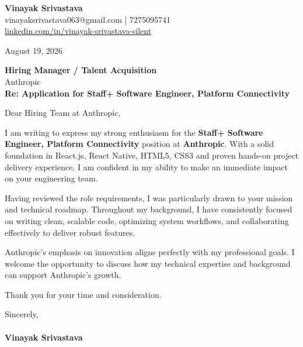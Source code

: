 \documentclass[11pt,a4paper]{article}
\begin{document}
\thispagestyle{empty}

{\Large \textbf{Vinayak Srivastava}}\\
vinayaksrivastava063@gmail.com | 7275095741 \\
\url{linkedin.com/in/vinayak-srivastava-silent}

\vspace{1em}
\hfill August 19, 2026

\textbf{Hiring Manager / Talent Acquisition}\\
Anthropic\\

\vspace{1.5em}
\textbf{Re: Application for Staff+ Software Engineer, Platform Connectivity}

\vspace{1em}
Dear Hiring Team at Anthropic,

I am writing to express my strong enthusiasm for the \textbf{Staff+ Software Engineer, Platform Connectivity} position at \textbf{Anthropic}. With a solid foundation in React.js, React Native, HTML5, CSS3 and proven hands-on project delivery experience, I am confident in my ability to make an immediate impact on your engineering team.

Having reviewed the role requirements, I was particularly drawn to your mission and technical roadmap. Throughout my background, I have consistently focused on writing clean, scalable code, optimizing system workflows, and collaborating effectively to deliver robust features.

Anthropic's emphasis on innovation aligns perfectly with my professional goals. I welcome the opportunity to discuss how my technical expertise and background can support Anthropic's growth.

Thank you for your time and consideration.

\vspace{1.5em}
Sincerely,\\
\vspace{1em}\\
\textbf{Vinayak Srivastava}
\end{document}
